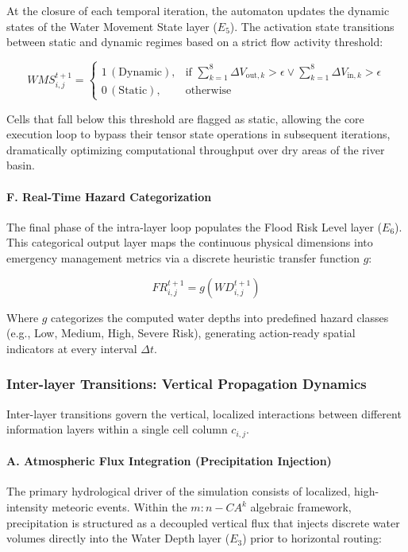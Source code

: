 At the closure of each temporal iteration, the automaton updates the dynamic states of the Water Movement State layer ($E_5$). The 
activation state transitions between static and dynamic regimes based on a strict flow activity threshold:

$$WMS_{i,j}^{t+1} = \begin{cases} 
1 \, (\text{Dynamic}), & \text{if } \sum_{k=1}^{8} \Delta V_{\text{out}, k} > \epsilon \lor \sum_{k=1}^{8} \Delta V_{\text{in}, k} > \epsilon \\ 
0 \, (\text{Static}), & \text{otherwise} 
\end{cases}$$

Cells that fall below this threshold are flagged as static, allowing the core execution loop to bypass their tensor state operations in 
subsequent iterations, dramatically optimizing computational throughput over dry areas of the river basin.

\paragraph{F. Real-Time Hazard Categorization}

The final phase of the intra-layer loop populates the Flood Risk Level layer ($E_6$). This categorical output layer maps the continuous 
physical dimensions into emergency management metrics via a discrete heuristic transfer function $g$:

$$FR_{i,j}^{t+1} = g\left(WD_{i,j}^{t+1}\right)$$

Where $g$ categorizes the computed water depths into predefined hazard classes (e.g., Low, Medium, High, Severe Risk), generating 
action-ready spatial indicators at every interval $\Delta t$.

\subsubsection{Inter-layer Transitions: Vertical Propagation Dynamics}

Inter-layer transitions govern the vertical, localized interactions between different information layers within a single cell column 
$c_{i,j}$.

\paragraph{A. Atmospheric Flux Integration (Precipitation Injection)}

The primary hydrological driver of the simulation consists of localized, high-intensity meteoric events. Within the $m:n-CA^k$ algebraic 
framework, precipitation is structured as a decoupled vertical flux that injects discrete water volumes directly into the Water Depth 
layer ($E_3$) prior to horizontal routing:

